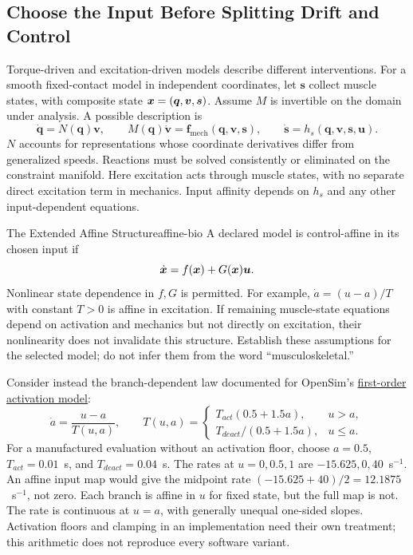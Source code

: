 \subsection{Choose the Input Before Splitting Drift and Control}

Torque-driven and excitation-driven models describe different interventions.
For a smooth fixed-contact model in independent coordinates, let $\bm s$
collect muscle states, with composite state $\bm{x}=(\bm q,\bm v,\bm s)$.
Assume $M$ is invertible on the domain under analysis. A possible description is
\[
 \dot{\bm q}=N(\bm q)\bm v,\qquad
 M(\bm q)\dot{\bm v}=\bm f_{\mathrm{mech}}(\bm q,\bm v,\bm s),
 \qquad\dot{\bm s}=h_s(\bm q,\bm v,\bm s,\bm u).
\]
$N$ accounts for representations whose coordinate derivatives differ from
generalized speeds. Reactions must be solved consistently or eliminated on
the constraint manifold. Here excitation acts through muscle states, with
no separate direct excitation term in mechanics. Input affinity depends on
$h_s$ and any other input-dependent equations.

\begin{principle}{The Extended Affine Structure}{affine-bio}
A declared model is control-affine in its chosen input if
\begin{equation}
 \dot{\bm{x}}=f(\bm{x})+G(\bm{x})\bm u.
 \label{eq:ch1:affine-bio}
\end{equation}
Nonlinear state dependence in $f,G$ is permitted. For example,
$\dot a=(u-a)/T$ with constant $T>0$ is affine in excitation. If remaining
muscle-state equations depend on activation and mechanics but not directly
on excitation, their nonlinearity does not invalidate this structure.
Establish these assumptions for the selected model; do not infer them from
the word ``musculoskeletal.''
\end{principle}

Consider instead the branch-dependent law documented for OpenSim's
\href{https://opensim-org.github.io/opensim-moco-site/docs/1.3.0/html_user/classOpenSim_1_1MuscleFirstOrderActivationDynamicModel.html}{first-order activation model}:
\[
 \dot a=\frac{u-a}{T(u,a)},\qquad
 T(u,a)=\begin{cases}
 T_{act}(0.5+1.5a),&u>a,\\
 T_{deact}/(0.5+1.5a),&u\leq a.
 \end{cases}
\]
For a manufactured evaluation without an activation floor, choose $a=0.5$,
$T_{act}=0.01$~s, and $T_{deact}=0.04$~s. The rates at $u=0,0.5,1$ are
$-15.625,0,40$~s$^{-1}$. An affine input map would give the midpoint rate
$(-15.625+40)/2=12.1875$~s$^{-1}$, not zero. Each branch is affine in
$u$ for fixed state, but the full map is not. The rate is continuous at $u=a$,
with generally unequal one-sided slopes. Activation floors and clamping in
an implementation need their own treatment; this arithmetic does not
reproduce every software variant.

